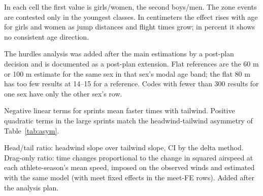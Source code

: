 \documentclass[12pt,a4paper]{article}
\begin{document}
\begin{table}[H]
\centering
\caption{Wind effect in the horizontal jumps by age band (gain per +1 m/s; values girls/women / boys/men; 95\,\% CIs clustered on meet).}
\label{tab:sjumps}
\scriptsize
\resizebox{\textwidth}{!}{}
\vspace{0.2em}
\parbox{0.97\textwidth}{\footnotesize In each cell the first value is girls/women, the second boys/men. The zone events are contested only in the youngest classes. In centimeters the effect rises with age for girls and women as jump distances and flight times grow; in percent it shows no consistent age direction.}
\end{table}

\begin{table}[H]
\centering
\caption{Wind effect in short hurdles by class-specific event code (sex-specific rows; flat-sprint reference for the same sex and distance class in that sex's modal age band for the code; 95\,\% CIs clustered on meet).}
\label{tab:hurdles}
\footnotesize
\resizebox{\textwidth}{!}{}
\vspace{0.2em}
\parbox{0.95\textwidth}{\footnotesize The hurdles analysis was added after the main estimations by a post-plan decision and is documented as a post-plan extension. Flat references are the 60 m or 100 m estimate for the same sex in that sex's modal age band; the flat 80 m has too few results at 14--15 for a reference. Codes with fewer than 300 results for one sex have only the other sex's row.}
\end{table}

\begin{table}[H]
\centering
\caption{Quadratic specification: linear and quadratic wind terms (raw outcome units per m/s: seconds for sprints, meters for jumps, e.g. 0.0328 m = 3.28 cm; SEs clustered on meet).}
\label{tab:squad}
\footnotesize

\vspace{0.2em}
\parbox{0.9\textwidth}{\footnotesize Negative linear terms for sprints mean faster times with tailwind. Positive quadratic terms in the large sprints match the headwind-tailwind asymmetry of Table~\ref{tab:asym}.}
\end{table}

\begin{table}[H]
\centering
\caption{Headwind/tailwind asymmetry on the 100 m by sex and age band, against drag-only physics at the athletes' own speeds (slopes in seconds per m/s, signed as gains with tailwind; 95\,\% CIs clustered on meet).}
\label{tab:sasym}
\scriptsize
\resizebox{\textwidth}{!}{}
\vspace{0.2em}
\parbox{0.97\textwidth}{\footnotesize Head/tail ratio: headwind slope over tailwind slope, CI by the delta method. Drag-only ratio: time changes proportional to the change in squared airspeed at each athlete-season's mean speed, imposed on the observed winds and estimated with the same model (with meet fixed effects in the meet-FE rows). Added after the analysis plan.}
\end{table}
\end{document}
